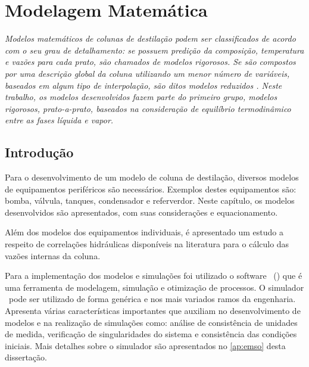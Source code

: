 %
%
%
\chapter{Modelagem Matemática} \label{chap:moddesenvolvidos}


\emph{Modelos matemáticos de colunas de destilação podem ser classificados de acordo com o seu grau de detalhamento:
se possuem predição da composição, temperatura e vazões para cada prato, são chamados de modelos rigorosos. Se são
compostos por uma descrição global da coluna utilizando um menor número de variáveis, baseados em algum tipo de
interpolação, são ditos modelos reduzidos \cite{Fletcher:2000}. Neste trabalho, os modelos desenvolvidos fazem parte do
primeiro
grupo, modelos rigorosos, prato-a-prato, baseados na consideração de equilíbrio termodinâmico entre as fases líquida e
vapor.
}

\section{Introdução}

Para o desenvolvimento de um modelo de coluna de destilação, diversos modelos
de equipamentos periféricos são necessários. Exemplos destes equipamentos são:
bomba, válvula, tanques, condensador e referverdor.
Neste capítulo, os modelos desenvolvidos são apresentados, com suas
considerações e equacionamento.

Além dos modelos dos equipamentos individuais, é apresentado um estudo a
respeito de correlações hidráulicas disponíveis na literatura para o cálculo
das vazões internas da coluna.

Para a implementação dos modelos e simulações foi utilizado o software \emso\
(\emsoname) que é uma ferramenta de modelagem, simulação e
otimização de processos.
O simulador \emso\ pode ser utilizado de forma genérica e nos mais variados
ramos da engenharia. Apresenta várias características importantes que auxiliam
no desenvolvimento de modelos e na realização de simulações como: análise de
consistência de unidades de medida, verificação de singularidades do sistema e
consistência das condições iniciais. Mais detalhes sobre o simulador são
apresentados no \autoref{ap:emso} desta dissertação.


